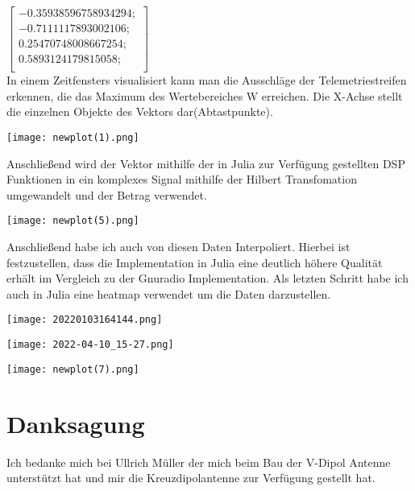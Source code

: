 \begin{multicols*}{2}
    \begin{math}
        \begin{bmatrix}
            -0.35938596758934294;\\
            -0.7111117893002106;\\
            0.25470748008667254;\\
            0.5893124179815058;\\
        \end{bmatrix}
    \end{math}
    \\
    In einem Zeitfensters visualisiert kann man die Ausschläge der Telemetriestreifen erkennen, die das Maximum des Wertebereiches W erreichen. Die X-Achse stellt die einzelnen Objekte des Vektors dar(Abtastpunkte).
    \\
    \begin{center}
        \centering
        \texttt{[image: newplot(1).png]}
    \end{center} 
    Anschließend wird der Vektor mithilfe der in Julia zur Verfügung gestellten DSP Funktionen in ein komplexes Signal mithilfe der Hilbert Transfomation umgewandelt und der Betrag verwendet.   
    \begin{center}
        \centering
        \texttt{[image: newplot(5).png]}
    \end{center} 
    Anschließend habe ich auch von diesen Daten Interpoliert. Hierbei ist festzustellen, dass die Implementation in Julia eine deutlich höhere Qualität erhält im Vergleich zu der Gnuradio Implementation. Als letzten Schritt habe ich auch in Julia eine heatmap verwendet um die Daten darzustellen.
\end{multicols*}
    
\begin{center}
    \centering
    \texttt{[image: 20220103164144.png]}
\end{center} 

\begin{center}
    \centering
    \texttt{[image: 2022-04-10\_15-27.png]}
\end{center}
\begin{center}
    \centering
    \texttt{[image: newplot(7).png]}
\end{center} 



\part*{Danksagung}

Ich bedanke mich bei Ullrich Müller der mich beim Bau der V-Dipol Antenne unterstützt hat und mir die Kreuzdipolantenne zur Verfügung gestellt hat.
